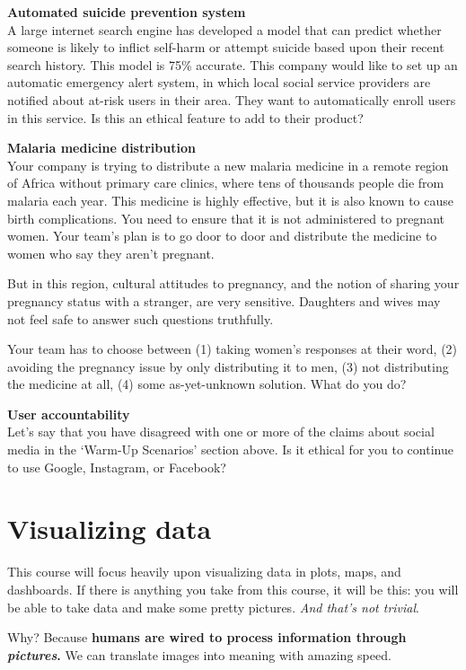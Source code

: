 \documentclass[]{book}
\begin{document}
\textbf{Automated suicide prevention system}\\
A large internet search engine has developed a model that can predict whether someone is likely to inflict self-harm or attempt suicide based upon their recent search history. This model is 75\% accurate. This company would like to set up an automatic emergency alert system, in which local social service providers are notified about at-risk users in their area. They want to automatically enroll users in this service. Is this an ethical feature to add to their product?

\textbf{Malaria medicine distribution}\\
Your company is trying to distribute a new malaria medicine in a remote region of Africa without primary care clinics, where tens of thousands people die from malaria each year. This medicine is highly effective, but it is also known to cause birth complications. You need to ensure that it is not administered to pregnant women. Your team's plan is to go door to door and distribute the medicine to women who say they aren't pregnant.

But in this region, cultural attitudes to pregnancy, and the notion of sharing your pregnancy status with a stranger, are very sensitive. Daughters and wives may not feel safe to answer such questions truthfully.

Your team has to choose between (1) taking women's responses at their word, (2) avoiding the pregnancy issue by only distributing it to men, (3) not distributing the medicine at all, (4) some as-yet-unknown solution. What do you do?

\textbf{User accountability}\\
Let's say that you have disagreed with one or more of the claims about social media in the `Warm-Up Scenarios' section above. Is it ethical for you to continue to use Google, Instagram, or Facebook?

\hypertarget{dataviz}{%
\chapter{Visualizing data}\label{dataviz}}

This course will focus heavily upon visualizing data in plots, maps, and dashboards. If there is anything you take from this course, it will be this: you will be able to take data and make some pretty pictures. \emph{And that's not trivial}.

Why? Because \textbf{humans are wired to process information through \emph{pictures}.} We can translate images into meaning with amazing speed.
\end{document}
